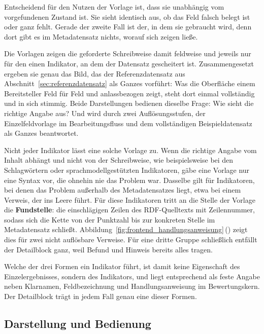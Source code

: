Entscheidend für den Nutzen der Vorlage ist, dass sie unabhängig vom vorgefundenen Zustand ist. Sie sieht identisch aus, ob das Feld falsch belegt ist oder ganz fehlt. Gerade der zweite Fall ist der, in dem sie gebraucht wird, denn dort gibt es im Metadatensatz nichts, worauf sich zeigen ließe.

Die Vorlagen zeigen die geforderte Schreibweise damit feldweise und jeweils nur für den einen Indikator, an dem der Datensatz gescheitert ist. Zusammengesetzt ergeben sie genau das Bild, das der Referenzdatensatz aus Abschnitt~\ref{sec:referenzdatensatz} als Ganzes vorführt: Was die Oberfläche einem Bereitsteller Feld für Feld und anlassbezogen zeigt, steht dort einmal vollständig und in sich stimmig. Beide Darstellungen bedienen dieselbe Frage: Wie sieht die richtige Angabe aus? Und wird durch zwei Auflösungsstufen, der Einzelfeldvorlage im Bearbeitungsfluss und dem vollständigen Beispieldatensatz als Ganzes beantwortet.

Nicht jeder Indikator lässt eine solche Vorlage zu. Wenn die richtige Angabe vom Inhalt abhängt und nicht von der Schreibweise, wie beispielsweise bei den Schlagwörtern oder sprachmodellgestützten Indikatoren, gäbe eine Vorlage nur eine Syntax vor, die ohnehin nie das Problem war. Dasselbe gilt für Indikatoren, bei denen das Problem außerhalb des Metadatensatzes liegt, etwa bei einem Verweis, der ins Leere führt. Für diese Indikatoren tritt an die Stelle der Vorlage die \textbf{Fundstelle}: die einschlägigen Zeilen des RDF-Quelltexts mit Zeilennummer, sodass sich die Kette von der Punktzahl bis zur konkreten Stelle im Metadatensatz schließt.
Abbildung~\ref{fig:frontend_handlungsanweisung}\,() zeigt dies für zwei nicht auflösbare Verweise. Für eine dritte Gruppe schließlich entfällt der Detailblock ganz, weil Befund und Hinweis bereits alles tragen. 

Welche der drei Formen ein Indikator führt, ist damit keine Eigenschaft des Einzelergebnisses, sondern des Indikators, und liegt entsprechend als feste Angabe neben Klarnamen, Feldbezeichnung und Handlungsanweisung im Bewertungskern. Der Detailblock trägt in jedem Fall genau eine dieser Formen.
\subsection{Darstellung und Bedienung}

